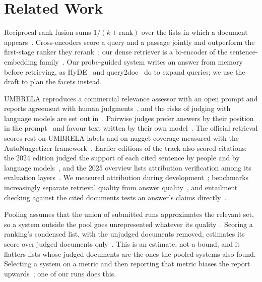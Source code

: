 \documentclass[sigconf,nonacm]{acmart}
\begin{document}
\section{Related Work}

Reciprocal rank fusion sums $1/(k+\mathrm{rank})$ over the lists in which a
document appears~\cite{cormack2009rrf}. Cross-encoders score a query and a passage
jointly and outperform the first-stage ranker they rerank~\cite{nogueira2019passage};
our dense retriever is a bi-encoder of the sentence-embedding
family~\cite{reimers2019sbert, xiao2024cpack}. Our probe-guided system writes an
answer from memory before retrieving, as HyDE~\cite{gao2023hyde} and
query2doc~\cite{wang2023query2doc} do to expand queries; we use the draft to plan
the facets instead.

UMBRELA reproduces a commercial relevance assessor with an open prompt and reports
agreement with human judgments~\cite{upadhyay2024umbrela, thomas2024searcher}, and
the risks of judging with language models are set out in~\cite{faggioli2023perspectives}.
Pairwise judges prefer answers by their position in the prompt~\cite{wang2024fair}
and favour text written by their own model~\cite{panickssery2024selfpref}. The
official retrieval scores rest on UMBRELA labels and on nugget coverage measured
with the AutoNuggetizer framework~\cite{pradeep2024nuggets, pradeep2025greatnugget}.
Earlier editions of the track also scored citations: the 2024 edition judged the
support of each cited sentence by people and by language
models~\cite{thakur2025support}, and the 2025 overview lists attribution
verification among its evaluation layers~\cite{upadhyay2026rag25}. We measured
attribution during development~\cite{gao2023alce}; benchmarks increasingly
separate retrieval quality from answer quality~\cite{yang2024crag}, and entailment
checking against the cited documents tests an answer's claims
directly~\cite{tang2024minicheck}.

Pooling assumes that the union of submitted runs approximates the relevant set, so
a system outside the pool goes unrepresented whatever its
quality~\cite{zobel1998reliable}. Scoring a ranking's condensed list, with the
unjudged documents removed, estimates its score over judged documents
only~\cite{sakai2007alternatives}. This is an estimate, not a bound, and it
flatters lists whose judged documents are the ones the pooled systems also found.
Selecting a system on a metric and then reporting that metric biases the report
upwards~\cite{cawley2010overfitting}; one of our runs does this.
\end{document}
